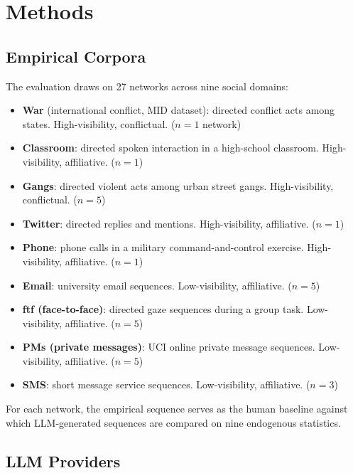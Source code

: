 \documentclass[11pt]{article}
\begin{document}
\section{Methods}
\label{sec:methods}

\subsection{Empirical Corpora}

The evaluation draws on 27 networks across nine social domains:

\begin{itemize}[leftmargin=2em]
  \item \textbf{War} (international conflict, MID dataset):
        directed conflict acts among states.
        High-visibility, conflictual. ($n=1$ network)
  \item \textbf{Classroom}: directed spoken interaction in a high-school
        classroom. High-visibility, affiliative. ($n=1$)
  \item \textbf{Gangs}: directed violent acts among urban street gangs.
        High-visibility, conflictual. ($n=5$)
  \item \textbf{Twitter}: directed replies and mentions.
        High-visibility, affiliative. ($n=1$)
  \item \textbf{Phone}: phone calls in a military command-and-control exercise.
        High-visibility, affiliative. ($n=1$)
  \item \textbf{Email}: university email sequences.
        Low-visibility, affiliative. ($n=5$)
  \item \textbf{ftf (face-to-face)}: directed gaze sequences during a group task.
        Low-visibility, affiliative. ($n=5$)
  \item \textbf{PMs (private messages)}: UCI online private message sequences.
        Low-visibility, affiliative. ($n=5$)
  \item \textbf{SMS}: short message service sequences.
        Low-visibility, affiliative. ($n=3$)
\end{itemize}

For each network, the empirical sequence serves as the human baseline
against which LLM-generated sequences are compared on nine endogenous
statistics.

\subsection{LLM Providers}
\end{document}
